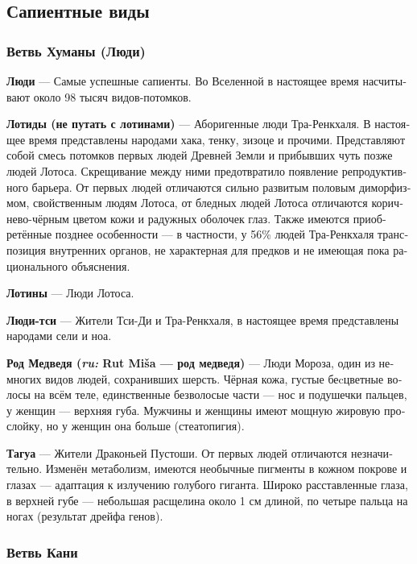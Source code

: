 \documentclass[a4paper,12pt,fleqn]{book}\usepackage{polyglossia}\setdefaultlanguage[babelshorthands=true]{russian}\setotherlanguage{english}\defaultfontfeatures{Ligatures=TeX,Mapping=tex-text}\usepackage{xcolor}\newcommand{\ml}[3]{#2}
\newcommand{\asterism}{\vspace{1em}{\centering\Large\bfseries$\ast~\ast~\ast$\par}\vspace{1em}}
\newcommand{\theterm}[3]{\textbf{\hypertarget{#1}{#2}} --- #3}
\newcommand{\theorigin}[3]{\textit{#1:} #2 --- #3}
\begin{document}
\subsection{Сапиентные виды}

\subsubsection{Ветвь Хуманы (Люди)}

\theterm{human-fork}
{Люди}
{Самые успешные сапиенты.
Во Вселенной в настоящее время насчитывают около 98 тысяч видов-потомков.}

\asterism

\theterm{lotids}
{Лотиды (не путать с лотинами)}
{Аборигенные люди Тра-Ренкхаля.
В настоящее время представлены народами хака, тенку, зизоце и прочими.
Представляют собой смесь потомков первых людей Древней Земли и прибывших чуть позже людей Лотоса.
Скрещивание между ними предотвратило появление репродуктивного барьера.
От первых людей отличаются сильно развитым половым диморфизмом, свойственным людям Лотоса, от бледных людей Лотоса отличаются коричнево-чёрным цветом кожи и радужных оболочек глаз.
Также имеются приобретённые позднее особенности --- в частности, у 56\% людей Тра-Ренкхаля транспозиция внутренних органов, не характерная для предков и не имеющая пока рационального объяснения.}

\theterm{lotins}
{Лотины}
{Люди Лотоса.}

\theterm{qi-humans}
{Люди-тси}
{Жители Тси-Ди и Тра-Ренкхаля, в настоящее время представлены народами сели и ноа.}

\theterm{rut-misa}
{Род Медведя (\theorigin{ru}{Rut Mi\v{s}a}{род медведя})}
{Люди Мороза, один из немногих видов людей, сохранивших шерсть.
Чёрная кожа, густые беcцветные волосы на всём теле, единственные безволосые части --- нос и подушечки пальцев, у женщин --- верхняя губа.
Мужчины и женщины имеют мощную жировую прослойку, но у женщин она больше (стеатопигия).}

\theterm{tagua}
{Тагуа}
{Жители Драконьей Пустоши.
От первых людей отличаются незначительно.
Изменён метаболизм, имеются необычные пигменты в кожном покрове и глазах --- адаптация к излучению голубого гиганта.
Широко расставленные глаза, в верхней губе --- небольшая расщелина около 1 см длиной, по четыре пальца на ногах (результат дрейфа генов).}

\subsubsection{Ветвь Кани}
\end{document}
